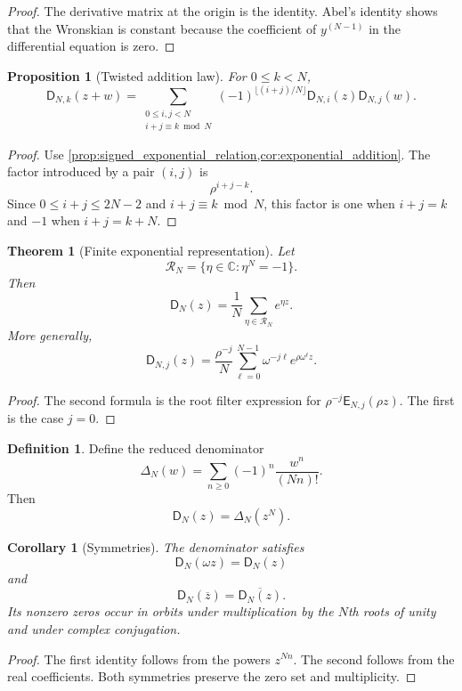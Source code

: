 \documentclass{aomart}
\newtheorem{theorem}{Theorem}[section]
\newtheorem{proposition}[proposition]{Proposition}
\newtheorem{corollary}[corollary]{Corollary}
\theoremstyle{definition}
\newtheorem{definition}[definition]{Definition}
\theoremstyle{remark}
\newcommand{\CC}{\mathbb C}
\newcommand{\Rcal}{\mathcal R}
\newcommand{\Dfun}{\mathsf D}
\newcommand{\Efun}{\mathsf E}
\begin{document}
\begin{proof}
The derivative matrix at the origin is the identity.  Abel's identity shows that the Wronskian is constant because the coefficient of $y^{(N-1)}$ in the differential equation is zero.
\end{proof}


\begin{proposition}[Twisted addition law]\label{prop:signed_addition}
For $0\leq k<N$,
\[
\Dfun_{N,k}(z+w)
=
\sum_{\substack{0\leq i,j<N\\ i+j\equiv k\bmod N}}
(-1)^{\lfloor(i+j)/N\rfloor}
\Dfun_{N,i}(z)\Dfun_{N,j}(w).
\]
\end{proposition}

\begin{proof}
Use \cref{prop:signed_exponential_relation,cor:exponential_addition}.  The factor introduced by a pair $(i,j)$ is
\[
\rho^{i+j-k}.
\]
Since $0\leq i+j\leq2N-2$ and $i+j\equiv k\bmod N$, this factor is one when $i+j=k$ and $-1$ when $i+j=k+N$.
\end{proof}

\begin{theorem}[Finite exponential representation]\label{thm:finite_exponential_representation}
Let
\[
\Rcal_N=\{\eta\in\CC\mathrel{:}\eta^N=-1\}.
\]
Then
\[
\Dfun_N(z)
=
\frac1N\sum_{\eta\in\Rcal_N}e^{\eta z}.
\]
More generally,
\[
\Dfun_{N,j}(z)
=
\frac{\rho^{-j}}N
\sum_{\ell=0}^{N-1}
\omega^{-j\ell}e^{\rho\omega^\ell z}.
\]
\end{theorem}

\begin{proof}
The second formula is the root filter expression for $\rho^{-j}\Efun_{N,j}(\rho z)$.  The first is the case $j=0$.
\end{proof}

\begin{definition}\label{def:reduced_denominator}
Define the reduced denominator
\[
\Delta_N(w)
=
\sum_{n\geq0}(-1)^n\frac{w^n}{(Nn)!}.
\]
Then
\[
\Dfun_N(z)=\Delta_N(z^N).
\]
\end{definition}

\begin{corollary}[Symmetries]\label{cor:denominator_symmetries}
The denominator satisfies
\[
\Dfun_N(\omega z)=\Dfun_N(z)
\]
and
\[
\Dfun_N(\overline z)=\overline{\Dfun_N(z)}.
\]
Its nonzero zeros occur in orbits under multiplication by the $N$th roots of unity and under complex conjugation.
\end{corollary}

\begin{proof}
The first identity follows from the powers $z^{Nn}$.  The second follows from the real coefficients.  Both symmetries preserve the zero set and multiplicity.
\end{proof}
\end{document}
